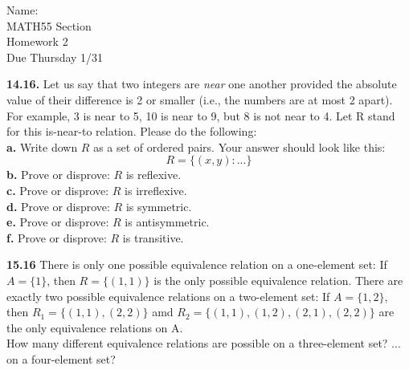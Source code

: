 \documentclass[10pt]{article}
\begin{document}

\begin{flushright}
	Name: \underline{\hspace{3cm}} \\
	MATH55 Section \underline{\hspace{0.5cm}} \\
	Homework 2 \\
	Due Thursday 1/31
\end{flushright}

\begin{framed}
	\textbf{14.16.} Let us say that two integers are \textit{near} one another provided the absolute value of their
    difference is 2 or smaller (i.e., the numbers are at most 2 apart). For example, 3 is near to 5, 10 is near to 9, but 8 is not near to 4.
    Let R stand for this is-near-to relation. Please do the following:\\

    \indent \textbf{a.} Write down $R$ as a set of ordered pairs. Your answer should look like this:\\
    $$ R = \{(x, y):...\} $$
    \indent \textbf{b.} Prove or disprove: $R$ is reflexive.\\
    \indent \textbf{c.} Prove or disprove: $R$ is irreflexive.\\
    \indent \textbf{d.} Prove or disprove: $R$ is symmetric.\\
    \indent \textbf{e.} Prove or disprove: $R$ is antisymmetric.\\
    \indent \textbf{f.} Prove or disprove: $R$ is transitive.
\end{framed}

\pagebreak

\begin{framed}
    \textbf{15.16} There is only one possible equivalence relation on a one-element set:
    If $A = \{1\}$, then $R = \{(1,1)\}$ is the only possible equivalence relation.
    There are exactly two possible equivalence relations on a two-element set:
    If $A=\{1, 2\}$, then $R_1 = \{(1,1),(2,2)\}$ amd $R_2 = \{(1,1),(1,2),(2,1),(2,2)\}$ are
    the only equivalence relations on A.\\

    \indent How many different equivalence relations are possible on a three-element set?
    ... on a four-element set?
\end{framed}

\pagebreak
\end{document}
